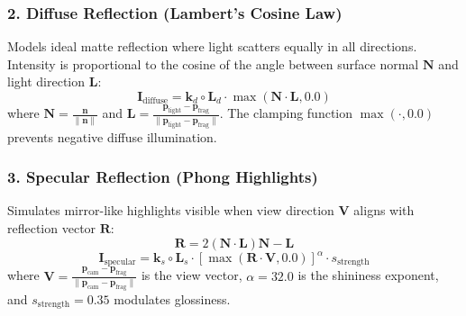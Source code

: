 \documentclass[11pt,a4paper]{article}
\begin{document}
\subsubsection{2. Diffuse Reflection (Lambert's Cosine Law)}
Models ideal matte reflection where light scatters equally in all directions. Intensity is proportional to the cosine of the angle between surface normal $\mathbf{N}$ and light direction $\mathbf{L}$:
\begin{equation}
    \mathbf{I}_{\text{diffuse}} = \mathbf{k}_d \circ \mathbf{L}_d \cdot \max\left(\mathbf{N} \cdot \mathbf{L}, 0.0\right)
\end{equation}
where $\mathbf{N} = \frac{\mathbf{n}}{\|\mathbf{n}\|}$ and $\mathbf{L} = \frac{\mathbf{p}_{\text{light}} - \mathbf{p}_{\text{frag}}}{\|\mathbf{p}_{\text{light}} - \mathbf{p}_{\text{frag}}\|}$. The clamping function $\max(\cdot, 0.0)$ prevents negative diffuse illumination.

\subsubsection{3. Specular Reflection (Phong Highlights)}
Simulates mirror-like highlights visible when view direction $\mathbf{V}$ aligns with reflection vector $\mathbf{R}$:
\begin{equation}
    \mathbf{R} = 2\left(\mathbf{N} \cdot \mathbf{L}\right)\mathbf{N} - \mathbf{L}
\end{equation}
\begin{equation}
    \mathbf{I}_{\text{specular}} = \mathbf{k}_s \circ \mathbf{L}_s \cdot \left[\max\left(\mathbf{R} \cdot \mathbf{V}, 0.0\right)\right]^{\alpha} \cdot s_{\text{strength}}
\end{equation}
where $\mathbf{V} = \frac{\mathbf{p}_{\text{cam}} - \mathbf{p}_{\text{frag}}}{\|\mathbf{p}_{\text{cam}} - \mathbf{p}_{\text{frag}}\|}$ is the view vector, $\alpha = 32.0$ is the shininess exponent, and $s_{\text{strength}} = 0.35$ modulates glossiness.
\end{document}

